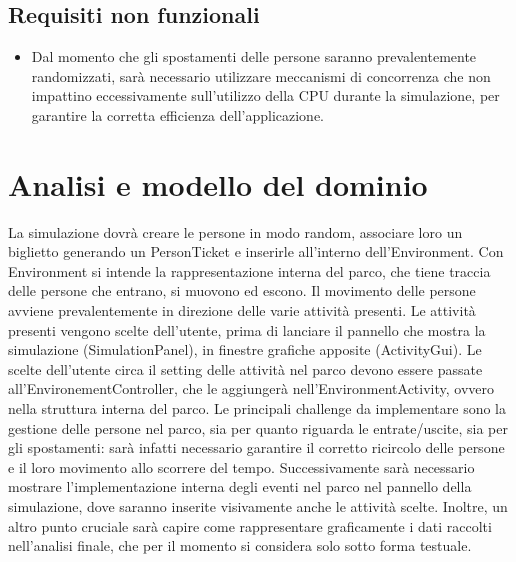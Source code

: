 \documentclass[a4paper,12pt]{report}
\begin{document}
\subsection*{Requisiti non funzionali}
\begin{itemize}
	\item Dal momento che gli spostamenti delle persone saranno prevalentemente randomizzati, sarà necessario utilizzare meccanismi di concorrenza che non impattino eccessivamente sull'utilizzo della CPU durante la simulazione, per garantire la corretta efficienza dell'applicazione.
\end{itemize}

\section{Analisi e modello del dominio}

La simulazione dovrà creare le persone in modo random, associare loro un biglietto generando un PersonTicket e inserirle all'interno dell'Environment. Con Environment si intende la rappresentazione interna del parco, che tiene traccia delle persone che entrano, si muovono ed escono. Il movimento delle persone avviene prevalentemente in direzione delle varie attività presenti. Le attività presenti vengono scelte dell'utente, prima di lanciare il pannello che mostra la simulazione (SimulationPanel), in finestre grafiche apposite (ActivityGui). Le scelte dell'utente circa il setting delle attività nel parco devono essere passate all'EnvironementController, che le aggiungerà nell'EnvironmentActivity, ovvero nella struttura interna del parco.
Le principali challenge da implementare sono la gestione delle persone nel parco, sia per quanto riguarda le entrate/uscite, sia per gli spostamenti: sarà infatti necessario garantire il corretto ricircolo delle persone e il loro movimento allo scorrere del tempo. Successivamente sarà necessario mostrare l'implementazione interna degli eventi nel parco nel pannello della simulazione, dove saranno inserite visivamente anche le attività scelte. Inoltre, un altro punto cruciale sarà capire come rappresentare graficamente i dati raccolti nell'analisi finale, che per il momento si considera solo sotto forma testuale.
\end{document}
